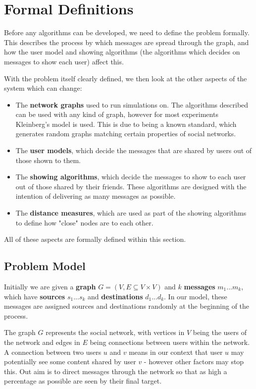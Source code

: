 \documentclass[bsc,frontabs,twoside,singlespacing,parskip,deptreport]{infthesis}     %
\begin{document}
\chapter{Formal Definitions}

Before any algorithms can be developed, we need to define the problem formally. This describes the process by which messages are spread through the graph, and how the user model and showing algorithms (the algorithms which decides on messages to show each user) affect this.

With the problem itself clearly defined, we then look at the other aspects of the system which can change:
\begin{itemize}
\item The \textbf{network graphs} used to run simulations on. The algorithms described can be used with any kind of graph, however for most experiments Kleinberg's model is used. This is due to being a known standard, which generates random graphs matching certain properties of social networks.
\item The \textbf{user models}, which decide the messages that are shared by users out of those shown to them.
\item The \textbf{showing algorithms}, which decide the messages to show to each user out of those shared by their friends. These algorithms are designed with the intention of delivering as many messages as possible.
\item The \textbf{distance measures}, which are used as part of the showing algorithms to define how "close" nodes are to each other.
\end{itemize}

All of these aspects are formally defined within this section.

\section{Problem Model}

Initially we are given a \textbf{graph} $G = (V, E \subseteq V \times V)$ and $k$ \textbf{messages} $ m_{1} ... m_{k}$, which have \textbf{sources} $s_{1} ... s_{k}$ and \textbf{destinations} $d_{1} ... d_{k}$. In our model, these messages are assigned sources and destinations randomly at the beginning of the process.

The graph $G$ represents the social network, with vertices in $V$ being the users of the network and edges in $E$ being connections between users within the network. A connection between two users $u$ and $v$ means in our context that user $u$ may potentially see some content shared by user $v$ - however other factors may stop this. Out aim is to direct messages through the network so that as high a percentage as possible are seen by their final target.
\end{document}
